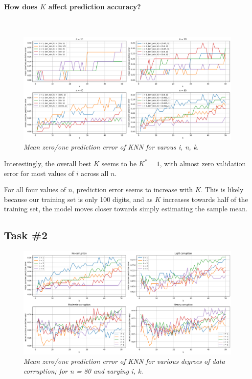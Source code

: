 \newpage
\paragraph{How does $K$ affect prediction accuracy?}~\smallskip

\begin{figure}[H]
  \includegraphics[width=\textwidth]{figures/fig2_1.png}
  \caption{\footnotesize \it Mean zero/one prediction error of KNN for varous i, n, k.}
\label{fig:2-1}
\end{figure}

Interestingly, the overall best $K$ seems to be $K^* = 1$, with almost zero
validation error for most values of $i$ across all $n$.

For all four values of $n$, prediction error seems to increase with $K$. This is
likely because our training set is only 100 digits, and as $K$ increases towards
half of the training set, the model moves closer towards simply estimating the
sample mean.


\subsection{Task \#2}

\begin{figure}[H]
  \includegraphics[width=\textwidth]{figures/fig2_3.png}
\caption{\footnotesize \it Mean zero/one prediction error of KNN for various degrees
         of data corruption; for n = 80 and varying i, k.}
\label{fig:2-3}
\end{figure}

